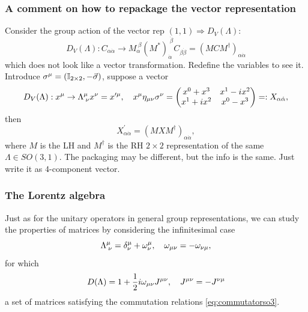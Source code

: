\subsubsection{A comment on how to repackage the vector representation}
Consider the group action of the vector rep $(1,1)\Rightarrow D_V(\Lambda)$:
\begin{equation*}
	D_V(\Lambda) : C_{\alpha \dot{\alpha}} \rightarrow M^{\;\beta}_\alpha (M^*)^{\;\dot{\beta}}_{\dot{\alpha}} C_{\beta \dot{\beta}} = (M C M^\dagger)_{\alpha \dot{\alpha}}
\end{equation*}
which does not look like a vector transformation. Redefine the variables to see it. Introduce $\sigma^\mu=(\mathbb{I}_{2\times 2}, - \vec{\sigma})$, suppose a vector
\begin{equation*}
	D_V(\Lambda):x^\mu \rightarrow \Lambda^\mu_{\;\nu} x^\nu = x^{\prime \mu},\quad x^\mu \eta_{\mu \nu} \sigma^\nu =\begin{pmatrix}
		x^0+x^3&x^1-ix^2\\
		x^1+ix^2 & x^0-x^3\\
	\end{pmatrix}
=:X_{\alpha \dot{\alpha}},
\end{equation*}
then
\begin{equation*}
X^\prime_{\alpha \dot{\alpha}} = (M X M^\dagger)_{\alpha \dot{\alpha}},
\end{equation*}
where $M$ is the LH and $M^\dagger$ is the RH $2\times 2$ representation of the same $\Lambda \in SO(3,1)$. The packaging may be different, but the info is the same. Just write it as $4$-component vector.




\subsubsection{The Lorentz algebra}
Just as for the unitary operators in general group representations, we can study the properties of matrices by considering the infinitesimal case
\begin{equation}
\Lambda^\mu_{\;\nu} = \delta^\mu_\nu + \omega^\mu_\nu,\quad \omega_{\mu \nu}=-\omega_{\nu\mu},
\end{equation}
for which
\begin{equation}
\label{eq:spinortrafo}
D(\Lambda) = 1 + \frac{1}{2} i \omega_{\mu \nu}  J^{\mu \nu},\quad J^{\mu \nu} = - J^{\nu \mu} 
\end{equation}
a set of matrices satisfying the commutation relations \ref{eq:commutatorso3}.











